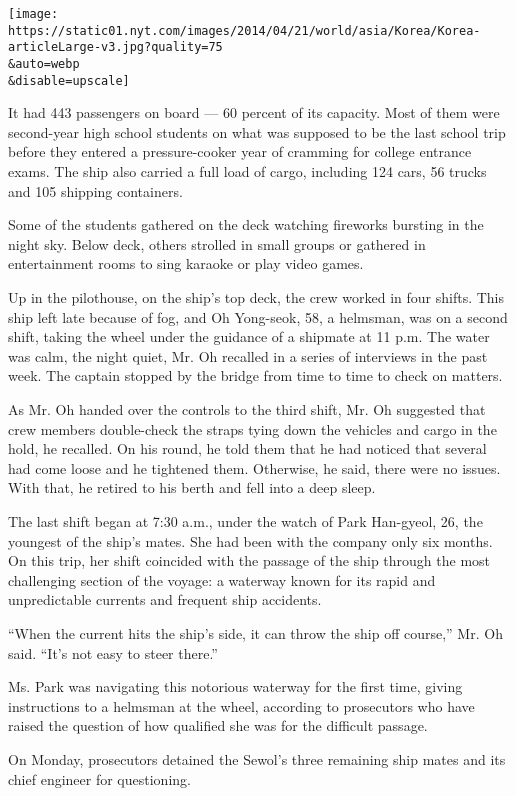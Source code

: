 \texttt{[image: https://static01.nyt.com/images/2014/04/21/world/asia/Korea/Korea-articleLarge-v3.jpg?quality=75\\\&auto=webp\\\&disable=upscale]}

It had 443 passengers on board --- 60 percent of its capacity. Most of
them were second-year high school students on what was supposed to be
the last school trip before they entered a pressure-cooker year of
cramming for college entrance exams. The ship also carried a full load
of cargo, including 124 cars, 56 trucks and 105 shipping containers.

Some of the students gathered on the deck watching fireworks bursting in
the night sky. Below deck, others strolled in small groups or gathered
in entertainment rooms to sing karaoke or play video games.

Up in the pilothouse, on the ship's top deck, the crew worked in four
shifts. This ship left late because of fog, and Oh Yong-seok, 58, a
helmsman, was on a second shift, taking the wheel under the guidance of
a shipmate at 11 p.m. The water was calm, the night quiet, Mr. Oh
recalled in a series of interviews in the past week. The captain stopped
by the bridge from time to time to check on matters.

As Mr. Oh handed over the controls to the third shift, Mr. Oh suggested
that crew members double-check the straps tying down the vehicles and
cargo in the hold, he recalled. On his round, he told them that he had
noticed that several had come loose and he tightened them. Otherwise, he
said, there were no issues. With that, he retired to his berth and fell
into a deep sleep.

The last shift began at 7:30 a.m., under the watch of Park Han-gyeol,
26, the youngest of the ship's mates. She had been with the company only
six months. On this trip, her shift coincided with the passage of the
ship through the most challenging section of the voyage: a waterway
known for its rapid and unpredictable currents and frequent ship
accidents.

``When the current hits the ship's side, it can throw the ship off
course,'' Mr. Oh said. ``It's not easy to steer there.''

Ms. Park was navigating this notorious waterway for the first time,
giving instructions to a helmsman at the wheel, according to prosecutors
who have raised the question of how qualified she was for the difficult
passage.

On Monday, prosecutors detained the Sewol's three remaining ship mates
and its chief engineer for questioning.

